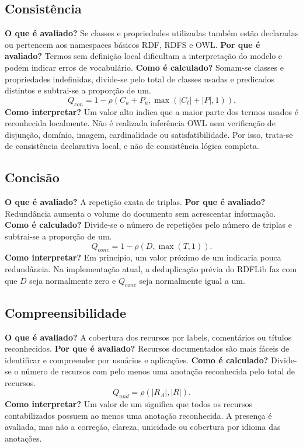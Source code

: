 \documentclass[12pt,a4paper]{article}
\newcommand{\card}[1]{\left\lvert #1\right\rvert}
\begin{document}
\subsection{Consistência}
\noindent\textbf{O que é avaliado?} Se classes e propriedades utilizadas também estão declaradas ou pertencem aos namespaces básicos RDF, RDFS e OWL. \textbf{Por que é avaliado?} Termos sem definição local dificultam a interpretação do modelo e podem indicar erros de vocabulário. \textbf{Como é calculado?} Somam-se classes e propriedades indefinidas, divide-se pelo total de classes usadas e predicados distintos e subtrai-se a proporção de um.
\[
Q_{con}=1-\rho(C_u+P_u,\max(\card{C_t}+\card{P},1)).
\]
\noindent\textbf{Como interpretar?} Um valor alto indica que a maior parte dos termos usados é reconhecida localmente. Não é realizada inferência OWL nem verificação de disjunção, domínio, imagem, cardinalidade ou satisfatibilidade. Por isso, trata-se de consistência declarativa local, e não de consistência lógica completa.
\subsection{Concisão}
\noindent\textbf{O que é avaliado?} A repetição exata de triplas. \textbf{Por que é avaliado?} Redundância aumenta o volume do documento sem acrescentar informação. \textbf{Como é calculado?} Divide-se o número de repetições pelo número de triplas e subtrai-se a proporção de um.
\[
Q_{conc}=1-\rho(D,\max(T,1)).
\]
\noindent\textbf{Como interpretar?} Em princípio, um valor próximo de um indicaria pouca redundância. Na implementação atual, a deduplicação prévia do RDFLib faz com que \(D\) seja normalmente zero e \(Q_{conc}\) seja normalmente igual a um.
\subsection{Compreensibilidade}
\noindent\textbf{O que é avaliado?} A cobertura dos recursos por labels, comentários ou títulos reconhecidos. \textbf{Por que é avaliado?} Recursos documentados são mais fáceis de identificar e compreender por usuários e aplicações. \textbf{Como é calculado?} Divide-se o número de recursos com pelo menos uma anotação reconhecida pelo total de recursos.
\[
Q_{und}=\rho(\card{R_A},\card{R}).
\]
\noindent\textbf{Como interpretar?} Um valor de um significa que todos os recursos contabilizados possuem ao menos uma anotação reconhecida. A presença é avaliada, mas não a correção, clareza, unicidade ou cobertura por idioma das anotações.
\end{document}
